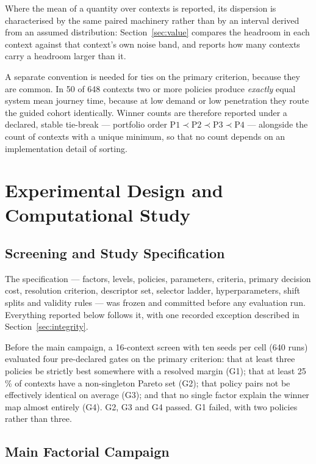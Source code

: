\documentclass[preprint,12pt]{elsarticle}
\begin{document}
Where the mean of a quantity over contexts is reported, its dispersion is
characterised by the same paired machinery rather than by an interval derived
from an assumed distribution: Section~\ref{sec:value} compares the headroom in
each context against that context's own noise band, and reports how many
contexts carry a headroom larger than it.

A separate convention is needed for ties on the primary criterion, because they
are common. In 50 of 648 contexts two or more policies produce \emph{exactly}
equal system mean journey time, because at low demand or low penetration they
route the guided cohort identically. Winner counts are therefore reported under
a declared, stable tie-break --- portfolio order $\mathrm{P1} \prec \mathrm{P2}
\prec \mathrm{P3} \prec \mathrm{P4}$ --- alongside the count of contexts with a
unique minimum, so that no count depends on an implementation detail of sorting.

\section{Experimental Design and Computational Study}
\label{sec:design}

\subsection{Screening and Study Specification}
\label{sec:design:screen}

The specification --- factors, levels, policies, parameters, criteria, primary
decision cost, resolution criterion, descriptor set, selector ladder,
hyperparameters, shift splits and validity rules --- was frozen and committed
before any evaluation run. Everything reported below follows it, with one
recorded exception described in Section~\ref{sec:integrity}.

Before the main campaign, a 16-context screen with ten seeds per cell (640 runs)
evaluated four pre-declared gates on the primary criterion: that at least three
policies be strictly best somewhere with a resolved margin (G1); that at least
25\,\% of contexts have a non-singleton Pareto set (G2); that policy pairs not be
effectively identical on average (G3); and that no single factor explain the
winner map almost entirely (G4). G2, G3 and G4 passed. G1 failed, with two
policies rather than three.

\subsection{Main Factorial Campaign}
\label{sec:design:main}
\end{document}
